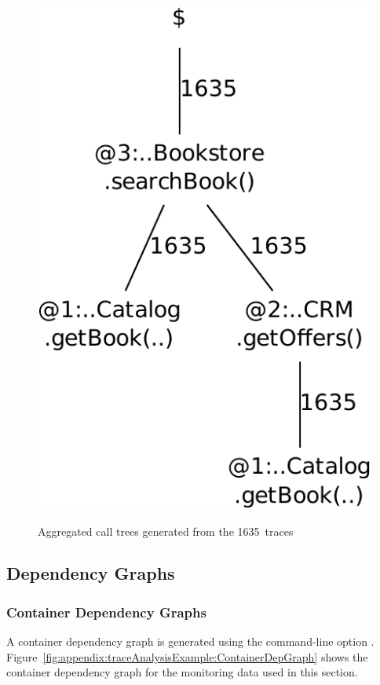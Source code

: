 \begin{figure}[h]
{\includegraphics[scale=0.4]{../../examples/userguide/ch5--trace-monitoring-aspectj/testdata/kieker-20100830-082225522-UTC-example-plots/aggregatedAssemblyCallTree-crop}%
}
\caption{Aggregated call trees generated from the 1635~traces}
\label{fig:appendix:traceAnalysisExample:AggregatedCallTrees}
\end{figure}

\pagebreak

\subsection{Dependency Graphs}

\subsubsection{Container Dependency Graphs}

A container dependency graph is generated using the command-line option %
\OPT{\OPTplotContainerDependencyGraph}. %
Figure~\ref{fig:appendix:traceAnalysisExample:ContainerDepGraph} shows the %
container dependency graph for the monitoring data used in this section. 

